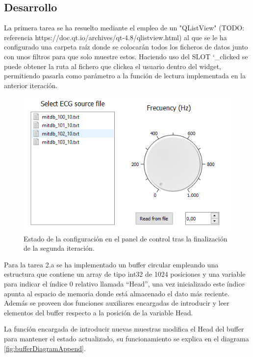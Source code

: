     \subsection{Desarrollo}
        
        La primera tarea se ha resuelto mediante el empleo de un "QListView"  (TODO:  referencia https://doc.qt.io/archives/qt-4.8/qlistview.html) al que se le ha configurado una carpeta raíz donde se colocarán todos los ficheros de datos junto con unos filtros para que solo muestre estos. Haciendo uso del SLOT \char`_clicked se puede obtener la ruta al fichero que clickea el usuario dentro del widget, permitiendo pasarla como parámetro a la función de lectura implementada en la anterior iteración. 
        
        \begin{figure}[H] 
                \centering
                        \includegraphics[width = 0.8 \linewidth]{figuras/fileView.png}
                \caption{Estado de la configuración en el panel de control tras la finalización de la segunda iteración.}
                \label{fig:fileView}
        \end{figure}
        
        Para la tarea 2.a se ha implementado un buffer circular empleando una estructura que contiene un array de tipo int32 de 1024 posiciones y una variable para indicar el índice 0 relativo llamada “Head”, una vez inicializado este índice apunta al espacio de memoria donde está almacenado el dato más reciente. Además se proveen dos funciones auxiliares encargadas de introducir y leer elementos del buffer respecto a la posición de la variable Head. 
        
        La función encargada de introducir nuevas muestras modifica el Head del buffer para mantener el estado actualizado, su funcionamiento se explica en el diagrama \ref{fig:bufferDiagramAppend}. 
    
